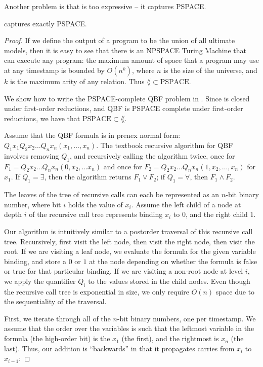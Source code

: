 Another problem is that \lang is too expressive -- it captures PSPACE.  

\begin{lemma}
\label{lem:lang-pspace}
\lang captures exactly PSPACE.
\end{lemma}
\begin{proof}
If we define the output of a \lang program to be the union of all ultimate models, then it is easy to see that there is an NPSPACE Turing Machine that can execute any \lang program: the maximum amount of space that a \lang program may use at any timestamp is bounded by $O(n^k)$, where $n$ is the size of the universe, and $k$ is the maximum arity of any relation.  Thus $\lang \subset \text{PSPACE}$.

We show how to write the PSPACE-complete QBF problem in \lang. Since \lang is closed under first-order reductions, and QBF is PSPACE complete under first-order reductions, we have that $\text{PSPACE} \subset \lang$.

Assume that the QBF formula is in prenex normal form: \linebreak$Q_1 x_1 Q_2 x_2 \ldots Q_n x_n(x_1, \ldots, x_n)$.  The textbook recursive algorithm for QBF involves removing $Q_1$, and recursively calling the algorithm twice, once for $F_1 = Q_2 x_2 \ldots Q_n x_n(0, x_2, \ldots x_n)$ and once for $F_2 = Q_2 x_2 \ldots Q_n x_n(1, x_2, \ldots, x_n)$ for $x_1$.  If $Q_1 = \exists$, then the algorithm returns $F_1 \lor F_2$; if $Q_1 = \forall$, then $F_1 \land F_2$.

The leaves of the tree of recursive calls can each be represented as an $n$-bit binary number, where bit $i$ holds the value of $x_i$.  Assume the left child of a node at depth $i$ of the recursive call tree represents binding $x_{i}$ to $0$, and the right child $1$.

Our algorithm is intuitively similar to a postorder traversal of this recursive call tree.  Recursively, first visit the left node, then visit the right node, then visit the root.  If we are visiting a leaf node, we evaluate the formula for the given variable binding, and store a $0$ or $1$ at the node depending on whether the formula is false or true for that particular binding.  If we are visiting a non-root node at level $i$, we apply the quantifier $Q_i$ to the values stored in the child nodes.  Even though the recursive call tree is exponential in size, we only require $O(n)$ space due to the sequentiality of the traversal.

First, we iterate through all of the $n$-bit binary numbers, one per timestamp.  We assume that the order over the variables is such that the leftmost variable in the formula (the high-order bit) is the $x_1$ (the first), and the rightmost is $x_n$ (the last).  Thus, our addition is ``backwards'' in that it propagates carries from $x_i$ to $x_{i-1}$:


\end{proof}
